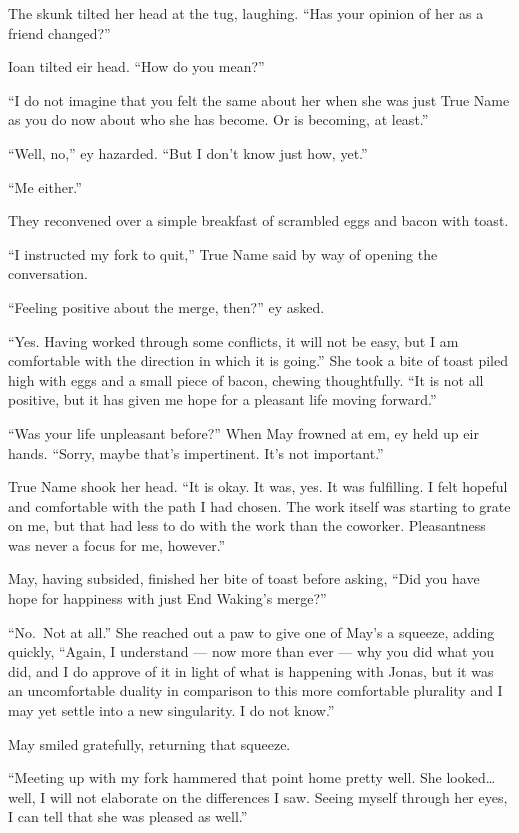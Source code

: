 The skunk tilted her head at the tug, laughing. ``Has your opinion of her as a friend changed?''

Ioan tilted eir head. ``How do you mean?''

``I do not imagine that you felt the same about her when she was just True Name as you do now about who she has become. Or is becoming, at least.''

``Well, no,'' ey hazarded. ``But I don't know just how, yet.''

``Me either.''

They reconvened over a simple breakfast of scrambled eggs and bacon with toast.

``I instructed my fork to quit,'' True Name said by way of opening the conversation.

``Feeling positive about the merge, then?'' ey asked.

``Yes. Having worked through some conflicts, it will not be easy, but I am comfortable with the direction in which it is going.'' She took a bite of toast piled high with eggs and a small piece of bacon, chewing thoughtfully. ``It is not all positive, but it has given me hope for a pleasant life moving forward.''

``Was your life unpleasant before?'' When May frowned at em, ey held up eir hands. ``Sorry, maybe that's impertinent. It's not important.''

True Name shook her head. ``It is okay. It was, yes. It was fulfilling. I felt hopeful and comfortable with the path I had chosen. The work itself was starting to grate on me, but that had less to do with the work than the coworker. Pleasantness was never a focus for me, however.''

May, having subsided, finished her bite of toast before asking, ``Did you have hope for happiness with just End Waking's merge?''

``No.~Not at all.'' She reached out a paw to give one of May's a squeeze, adding quickly, ``Again, I understand — now more than ever — why you did what you did, and I do approve of it in light of what is happening with Jonas, but it was an uncomfortable duality in comparison to this more comfortable plurality and I may yet settle into a new singularity. I do not know.''

May smiled gratefully, returning that squeeze.

``Meeting up with my fork hammered that point home pretty well. She looked\ldots well, I will not elaborate on the differences I saw. Seeing myself through her eyes, I can tell that she was pleased as well.''

